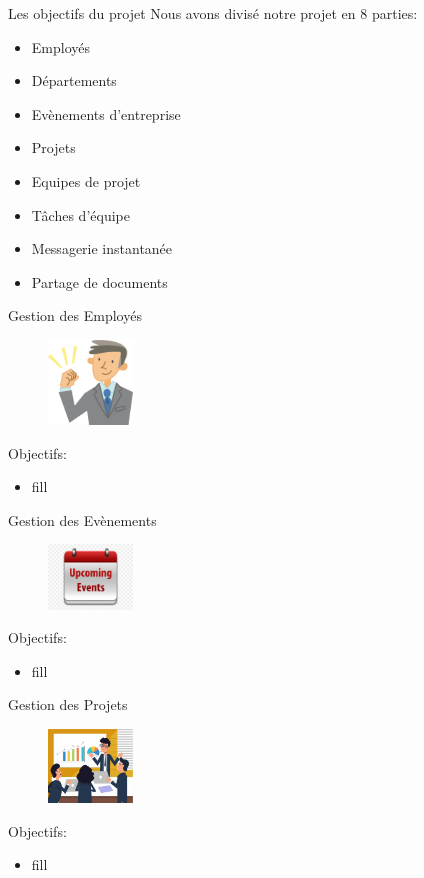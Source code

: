 \begin{frame}{Les objectifs du projet}
 Nous avons divisé notre projet en 8 parties:
  \begin{itemize}
  \item Employés
\item Départements
 \item Evènements d'entreprise
 \item Projets
 \item Equipes de projet
 \item Tâches d'équipe
  \item Messagerie instantanée
\item Partage de documents
    \end{itemize}
\end{frame}

\begin{frame}{Gestion des Employés}
\begin{figure}[h!]
  \includegraphics[width=0.2\textwidth]{images/employee}
\end{figure}
Objectifs:
  \begin{itemize}
\item fill
    \end{itemize}
\end{frame}

\begin{frame}{Gestion des Evènements}
\begin{figure}[h!]
  \includegraphics[width=0.20\textwidth]{images/142-1420139_clipart-upcoming-events-calendar}
\end{figure}
Objectifs:
  \begin{itemize}
\item fill
    \end{itemize}
\end{frame}


\begin{frame}{Gestion des Projets}
\begin{figure}[h!]
  \includegraphics[width=0.20\textwidth]{images/manager_work_background_colleagues_meeting_icons_cartoon_characters_6836720}
\end{figure}
Objectifs:
  \begin{itemize}
\item fill
    \end{itemize}
\end{frame}

